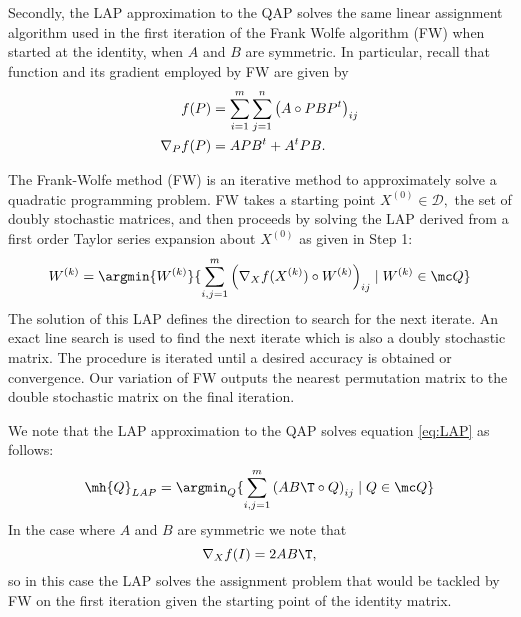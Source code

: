 Secondly, the LAP approximation to the QAP solves the same  linear assignment
algorithm used in the first iteration of the Frank Wolfe algorithm (FW) when started
at the identity, when $A$ and $B$ are symmetric.   In particular, recall that function and its gradient
employed by FW are
given by
$$ \aligned
f(P)
&= \sum_{i=1}^m \sum_{j=1}^n \left( A \circ PBP^t \right)_{ij}\\
\nabla_Pf(P) &= APB^t+ A^tPB.
\endaligned
$$

The Frank-Wolfe method (FW) is an iterative method to approximately solve
a quadratic programming problem.   FW takes a starting point 
$X^{(0)}\in \mathcal D,$ the set of doubly stochastic matrices, and then proceeds by solving the LAP derived from a first order Taylor series expansion about $X^{(0)}$ as given in Step 1:   
$$
W^{(k)} = {\argmin{W^{(k)}}}
\lbrace { \sum_{i,j=1}^m \left( \nabla_X f(X^{(k)}) \circ W^{(k)} \right)_{ij}
\mid W^{(k)} \in {\mc Q} }\rbrace
$$
The solution of this LAP defines the
direction to search for the next iterate.  An exact line search is used to find the next iterate which is also a doubly stochastic matrix.  
The procedure is iterated until a desired 
accuracy is obtained or convergence.    Our variation of FW outputs
the nearest permutation matrix to the double stochastic matrix on the final
iteration.   

We note that the LAP approximation to the QAP solves equation
 \ref{eq:LAP} as follows:
$$
\mh {Q}_{LAP}=\argmin_{Q}\lbrace { \sum_{i,j=1}^m \left(AB\T \circ Q \right)_{ij}
\mid Q \in {\mc Q} }\rbrace
$$
In the case where $A$ and $B$ are symmetric we note that 
$$ \nabla_X f(I)=2AB\T,$$
so in this case the LAP solves the assignment problem that would be
tackled by FW on the first iteration given the starting point of the identity matrix.

